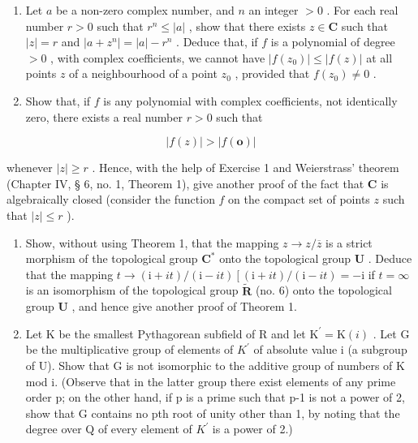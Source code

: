 \ExerciseSection

\begin{enumerate}
\def\labelenumi{\arabic{enumi})}
\item
  Let \(a\) be a non-zero complex number, and \(n\) an integer \(>0\) . For each real number \(r > 0\) such that \(r^n \leqslant |a|\) , show that there exists \(z \in \mathbf{C}\) such that \(|z| = r\) and \(|a + z^n| = |a| - r^n\) . Deduce that, if \(f\) is a polynomial of degree \(>0\) , with complex coefficients, we cannot have \(|f(z_0)| \leqslant |f(z)|\) at all points \(z\) of a neighbourhood of a point \(z_0\) , provided that \(f(z_0) \neq 0\) .
\item
  Show that, if \(f\) is any polynomial with complex coefficients, not identically zero, there exists a real number \(r > 0\) such that
\end{enumerate}

\[
\left| f (z) \right| > \left| f (\mathbf {o}) \right|
\]

whenever \(|z| \geqslant r\) . Hence, with the help of Exercise 1 and Weierstrass' theorem (Chapter IV, § 6, no. 1, Theorem 1), give another proof of the fact that \(\mathbf{C}\) is algebraically closed (consider the function \(f\) on the compact set of points \(z\) such that \(|z| \leqslant r\) ).

\begin{enumerate}
\def\labelenumi{\arabic{enumi})}
\setcounter{enumi}{2}
\item
  Show, without using Theorem 1, that the mapping \(z \to z / \overline{z}\) is a strict morphism of the topological group \(\mathbf{C}^*\) onto the topological group \(\mathbf{U}\) . Deduce that the mapping \(t \to (\mathrm{i} + it) / (\mathrm{i} - it) \left[ (\mathrm{i} + it) / (\mathrm{i} - it) = -\mathrm{i} \right.\) if \(t = \infty\) is an isomorphism of the topological group \(\tilde{\mathbf{R}}\) (no. 6) onto the topological group \(\mathbf{U}\) , and hence give another proof of Theorem 1.
\item
  Let K be the smallest Pythagorean subfield of R and let \(\mathrm{K}^{\prime}=\mathrm{K}(i)\) . Let G be the multiplicative group of elements of \(K^{\prime}\) of absolute value i (a subgroup of U). Show that G is not isomorphic to the additive group of numbers of K mod i. (Observe that in the latter group there exist elements of any prime order p; on the other hand, if p is a prime such that p-1 is not a power of 2, show that G contains no pth root of unity other than 1, by noting that the degree over Q of every element of \(K^{\prime}\) is a power of 2.)
\end{enumerate}

